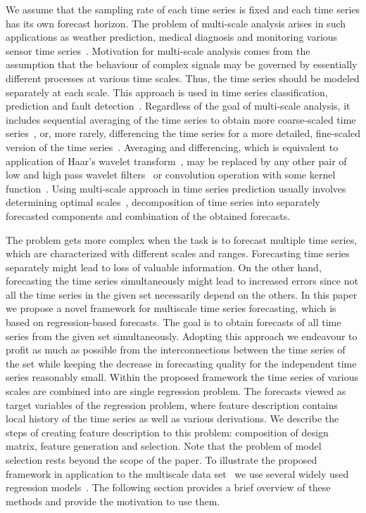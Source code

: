 \documentclass[conference]{IEEEtran}
\begin{document}
We assume that the sampling rate of each time series is fixed and each time series has its own forecast horizon. The problem of multi-scale analysis arises in such applications as weather prediction, medical diagnosis and monitoring various sensor time series~\cite{Costa2008, Ahmed2012, Cortez2012, Ferreira2006}. Motivation for multi-scale analysis comes from the assumption that the behaviour of complex signals may be governed by  essentially different processes at various time scales. Thus, the time series should be modeled separately at each scale. This approach is used in time series classification, prediction and fault detection~\cite{Cui2016, Cortez2012, Aldrich2013}. Regardless of the goal of multi-scale analysis, it includes sequential averaging of the time series to obtain more coarse-scaled time series~\cite{Wu2013}, or, more rarely, differencing the time series for a more detailed, fine-scaled version of the time series~\cite{Jiang2011}. Averaging and differencing, which is equivalent to application of Haar's wavelet transform~\cite{Jiang2011}, may be replaced by any other pair of low and high pass wavelet filters~\cite{Chen2004} or convolution operation with some kernel function~\cite{Vespier2012}. Using multi-scale approach in time series prediction usually involves determining optimal scales~\cite{Vespier2012, Ahmed2012}, decomposition of time series into separately forecasted components and combination of the obtained forecasts.

The problem gets more complex when the task is to forecast multiple time series, which are characterized with different scales and ranges. Forecasting time series separately might lead to loss of valuable information. On the other hand, forecasting the time series simultaneously might lead to increased errors since not all the time series in the given set necessarily depend on the others. In this paper we propose a novel framework for multiscale time series forecasting, which is based on regression-based forecasts. The goal is to obtain forecasts of all time series from the given set simultaneously. Adopting this approach we endeavour to profit as much as possible from the interconnections between the time series of the set while keeping the decrease in forecasting quality for the independent time series reasonably small. Within the proposed framework the time series of various scales are combined into are single regression problem. The forecasts viewed as target variables of the regression problem, where feature description contains local history of the time series as well as various derivations. We describe the steps of creating feature description to this problem: composition of design matrix, feature generation and selection. Note that the problem of model selection rests beyond the scope of the paper. To illustrate the proposed framework in application to the multiscale data set~\cite{EnergyWeatherData} we use several widely used regression models~\cite{Yu2016, Kane2014, Trafalis2000, Navarrete2015, Taylor2009, Qiu2014}. The following section provides a brief overview of these methods and provide the motivation to use them.
\end{document}

